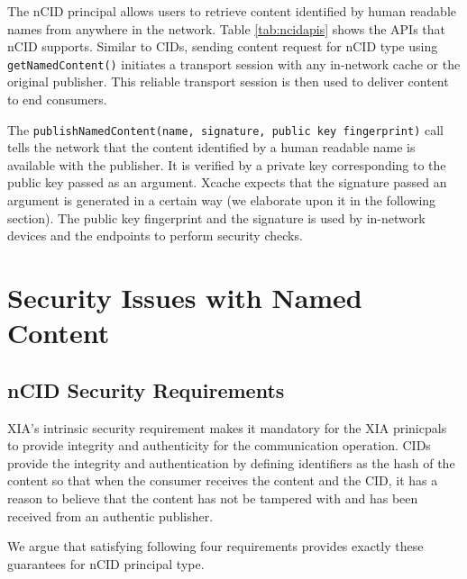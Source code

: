 The nCID principal allows users to retrieve content identified by
human readable names from anywhere in the network. Table
\ref{tab:ncidapis} shows the APIs that nCID supports. Similar to CIDs,
sending content request for nCID type using \texttt{getNamedContent()}
initiates a transport session with any in-network cache or the
original publisher. This reliable transport session is then used to
deliver content to end consumers.

The \texttt{publishNamedContent(name, signature, public key
  fingerprint)} call tells the network that the content identified by
a human readable name is available with the publisher. It is verified
by a private key corresponding to the public key passed as an
argument. Xcache expects that the signature passed an argument is
generated in a certain way (we elaborate upon it in the following
section). The public key fingerprint and the signature is used by
in-network devices and the endpoints to perform security checks.

\section{Security Issues with Named Content}

\subsection{nCID Security Requirements}

XIA’s intrinsic security requirement makes it mandatory for the XIA
prinicpals to provide integrity and authenticity for the communication
operation. CIDs provide the integrity and authentication by defining
identifiers as the hash of the content so that when the consumer
receives the content and the CID, it has a reason to believe that the
content has not be tampered with and has been received from an
authentic publisher.

We argue that satisfying following four requirements provides exactly
these guarantees for nCID principal type.

